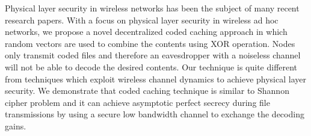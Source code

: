 \documentclass[10pt,journal]{IEEEtran}
\begin{document}
 

Physical layer security in wireless networks has been the subject of many recent research papers. With a focus on physical layer security in wireless ad hoc networks, we propose a novel decentralized coded caching approach in which random vectors are used to combine the contents using XOR operation. Nodes only transmit coded files and therefore an eavesdropper with a noiseless channel will not be able to decode the desired contents. Our technique is quite different from techniques which exploit wireless channel dynamics to achieve physical layer security. We demonstrate that coded caching technique is similar to Shannon cipher \cite{shannon1949communication} problem and it can  achieve asymptotic perfect secrecy during file transmissions by using a secure low bandwidth channel to exchange the decoding gains.  
\end{document}

